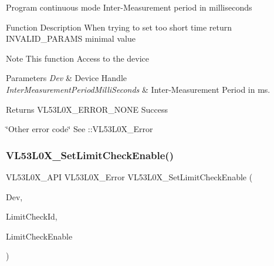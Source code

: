 Program continuous mode Inter-\/\+Measurement period in milliseconds

\begin{DoxyParagraph}{Function Description}
When trying to set too short time return I\+N\+V\+A\+L\+I\+D\+\_\+\+P\+A\+R\+A\+MS minimal value
\end{DoxyParagraph}
\begin{DoxyNote}{Note}
This function Access to the device
\end{DoxyNote}

\begin{DoxyParams}{Parameters}
{\em Dev} & Device Handle \\
\hline
{\em Inter\+Measurement\+Period\+Milli\+Seconds} & Inter-\/\+Measurement Period in ms. \\
\hline
\end{DoxyParams}
\begin{DoxyReturn}{Returns}
V\+L53\+L0\+X\+\_\+\+E\+R\+R\+O\+R\+\_\+\+N\+O\+NE Success 

\char`\"{}\+Other error code\char`\"{} See \+::\+V\+L53\+L0\+X\+\_\+\+Error 
\end{DoxyReturn}
\mbox{\label{group__VL53L0X__parameters__group_ga356967db0182329895ed339c70ad21af}} 
\subsubsection{\texorpdfstring{V\+L53\+L0\+X\+\_\+\+Set\+Limit\+Check\+Enable()}{VL53L0X\_SetLimitCheckEnable()}}
{\footnotesize\ttfamily V\+L53\+L0\+X\+\_\+\+A\+PI V\+L53\+L0\+X\+\_\+\+Error V\+L53\+L0\+X\+\_\+\+Set\+Limit\+Check\+Enable (\begin{DoxyParamCaption}\item[{\hyperlink{group__VL53L0X__platform__group_ga2d6405308b1dd524b462f1b8fb97d167}{V\+L53\+L0\+X\+\_\+\+D\+EV}}]{Dev,  }\item[{\hyperlink{vl53l0x__types_8h_a273cf69d639a59973b6019625df33e30}{uint16\+\_\+t}}]{Limit\+Check\+Id,  }\item[{\hyperlink{vl53l0x__types_8h_aba7bc1797add20fe3efdf37ced1182c5}{uint8\+\_\+t}}]{Limit\+Check\+Enable }\end{DoxyParamCaption})}



